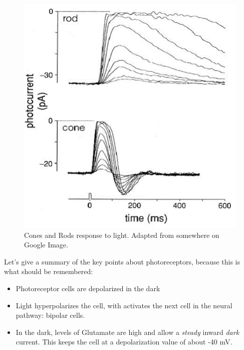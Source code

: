 \begin{figure}[H]
    \centering
    \includegraphics[width=0.5\linewidth]{../../Figures/Cone_Rod_Response.PNG}
    \caption{Cones and Rods response to light. Adapted from somewhere on Google Image.}
    \label{fig:Cone_Rode_Response}
\end{figure}

Let's give a summary of the key points about photoreceptors, because this is what should be remembered: 

\begin{itemize}
    \item Photoreceptor cells are depolarized in the dark
    \item Light hyperpolarizes the cell, with activates the next cell in the neural pathway: bipolar cells. 
    \item In the dark, levels of Glutamate are high and allow a \textit{steady} inward \textit{dark} current. This keeps the cell at a depolarization value of about -40 mV. 
\end{itemize}
